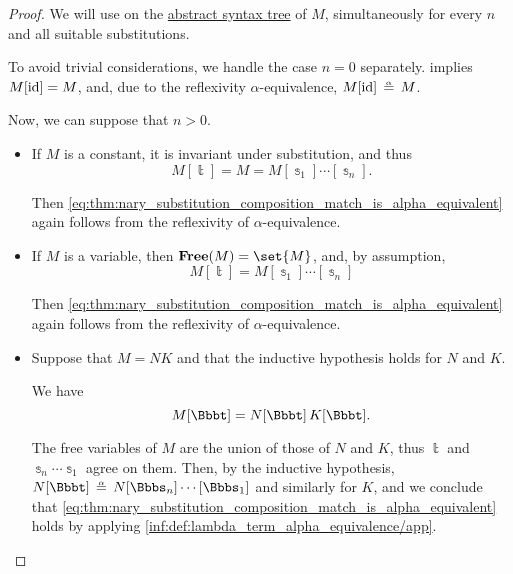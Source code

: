 \begin{proof}
  We will use  on the \hyperref[def:lambda_term_ast]{abstract syntax tree} of \( M \), simultaneously for every \( n \) and all suitable substitutions.

  To avoid trivial considerations, we handle the case \( n = 0 \) separately.  implies \( M[\operatorname{id}] = M \), and, due to the reflexivity \( \alpha \)-equivalence, \( M[\id] \aequiv M \).

  Now, we can suppose that \( n > 0 \).

  \begin{itemize}
    \item If \( M \) is a constant, it is invariant under substitution, and thus
    \begin{equation*}
      M[\Bbbt] = M = M[\Bbbs_1] \cdots [\Bbbs_n].
    \end{equation*}

    Then \eqref{eq:thm:nary_substitution_composition_match_is_alpha_equivalent} again follows from the reflexivity of \( \alpha \)-equivalence.

    \item If \( M \) is a variable, then \( \op*{Free}(M) = \set{ M } \), and, by assumption,
    \begin{equation*}
      M[\Bbbt] = M[\Bbbs_1] \cdots [\Bbbs_n]
    \end{equation*}

    Then \eqref{eq:thm:nary_substitution_composition_match_is_alpha_equivalent} again follows from the reflexivity of \( \alpha \)-equivalence.

    \item Suppose that \( M = NK \) and that the inductive hypothesis holds for \( N \) and \( K \).

    We have
    \begin{equation*}
      M[\Bbbt] = N[\Bbbt] \thinspace K[\Bbbt].
    \end{equation*}

    The free variables of \( M \) are the union of those of \( N \) and \( K \), thus \( \Bbbt \) and \( \Bbbs_n \cdots \Bbbs_1 \) agree on them. Then, by the inductive hypothesis, \( N[\Bbbt] \aequiv N[\Bbbs_n] \cdots [\Bbbs_1] \) and similarly for \( K \), and we conclude that \eqref{eq:thm:nary_substitution_composition_match_is_alpha_equivalent} holds by applying \ref{inf:def:lambda_term_alpha_equivalence/app}.


\end{itemize}
\end{proof}
